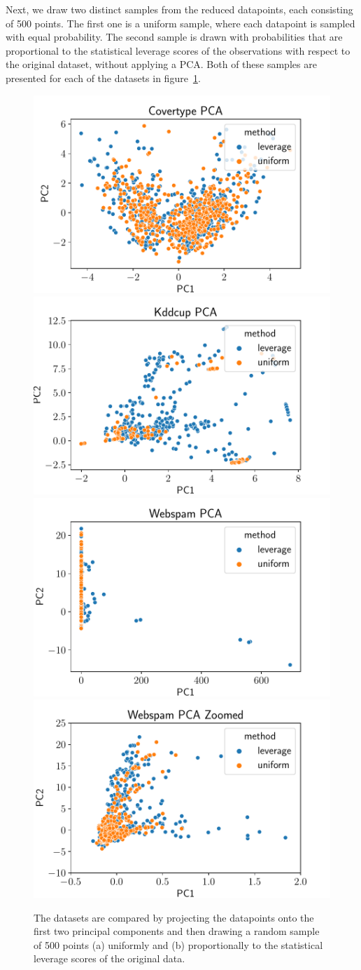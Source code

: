 Next, we draw two distinct samples from the reduced datapoints,
each consisting of 500 points. The first one is a uniform sample,
where each datapoint is sampled with equal probability.
The second sample is drawn with probabilities that are proportional
to the statistical leverage scores of the observations with
respect to the original dataset, without applying a PCA.
Both of these samples are presented for each of the datasets in
figure~\ref{fig:dataset-comparison}.

\begin{figure}[ht!]
    \centering
    \includegraphics[width=.49\linewidth]{figures/covertype_pca.pdf}
    \includegraphics[width=.49\linewidth]{figures/kddcup_pca.pdf}
    \includegraphics[width=.49\linewidth]{figures/webspam_pca.pdf}
    \includegraphics[width=.49\linewidth]{figures/webspam_pca_zoomed.pdf}
    \caption{The datasets are compared by projecting the datapoints
        onto the first two principal components and then drawing
        a random sample of 500 points (a) uniformly and (b) proportionally to the
        statistical leverage scores of the original data.}
    \label{fig:dataset-comparison}
\end{figure}

